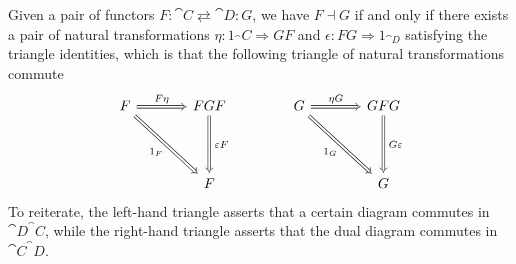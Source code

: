 \begin{theorem}\label{adjunitco}
Given a pair of functors $F : \cat{C} \rightleftarrows \cat{D}: G$, we have $F\dashv G$ if and only if there exists a pair of natural transformations $\eta : 1_\cat{C} \Rightarrow GF$ and $\epsilon : FG \Rightarrow 1_{\cat{D}}$ satisfying the triangle identities, which is that the following triangle of natural transformations commute
\[\begin{tikzcd}[column sep=large, row sep=huge]
F \arrow[r, "F\eta", Rightarrow] \arrow[rd, "1_F"', Rightarrow] & FGF \arrow[d, "\,\epsilon F", Rightarrow] \\[0.5em]
                                                                & F                                      
\end{tikzcd}
\qquad\qquad
\begin{tikzcd}[column sep=large, row sep=huge]
G \arrow[r, "\eta G", Rightarrow] \arrow[rd, "1_G"', Rightarrow] & GFG \arrow[d, "\,G\epsilon", Rightarrow] \\[0.5em]
                                                                 & G                                     
\end{tikzcd}\]
To reiterate, the left-hand triangle asserts that a certain diagram commutes in $\cat{D}^\cat{C}$, while the right-hand triangle asserts that the dual diagram commutes in $\cat{C}^\cat{D}$.
\end{theorem}

 \vspace*{0.1in}

